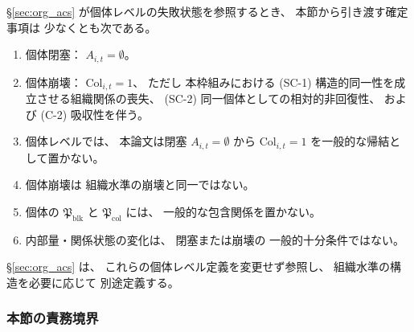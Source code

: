 \begin{remark}[組織ACSの節へ渡す個体レベルの確定事項]
\label{rem:sec7_to_sec8_interface}
\S\ref{sec:org_acs}
が個体レベルの失敗状態を参照するとき、
本節から引き渡す確定事項は
少なくとも次である。

\begin{enumerate}
  \item
  個体閉塞：
  $A_{i,t}=\emptyset$。

  \item
  個体崩壊：
  $\mathrm{Col}_{i,t}=1$、
  ただし
  本枠組みにおける
  (SC-1) 構造的同一性を成立させる組織関係の喪失、
  (SC-2) 同一個体としての相対的非回復性、
  および (C-2) 吸収性を伴う。

  \item
  個体レベルでは、
  本論文は閉塞 $A_{i,t}=\emptyset$ から
  $\mathrm{Col}_{i,t}=1$ を一般的な帰結として置かない。

  \item
  個体崩壊は
  組織水準の崩壊と同一ではない。

  \item
  個体の
  $\mathfrak{P}_{\mathrm{blk}}$
  と
  $\mathfrak{P}_{\mathrm{col}}$
  には、
  一般的な包含関係を置かない。

  \item
  内部量・関係状態の変化は、
  閉塞または崩壊の
  一般的十分条件ではない。
\end{enumerate}

\S\ref{sec:org_acs} は、
これらの個体レベル定義を変更せず参照し、
組織水準の構造を必要に応じて
別途定義する。
\end{remark}

\subsubsection{本節の責務境界}


